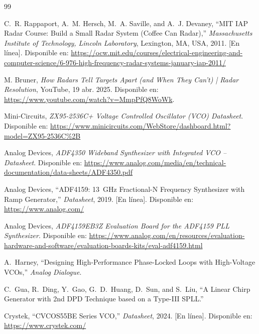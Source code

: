 
\renewcommand{\bibname}{Referencias}
\begin{thebibliography}{99}
\setcounter{enumiv}{9}   %
\setlength{\itemsep}{0.25em}
\setlength{\parskip}{0pt}
\setlength{\parsep}{0pt}


C.~R. Rappaport, A.~M. Hersch, M.~A. Saville, and A.~J. Devaney,
``MIT IAP Radar Course: Build a Small Radar System (Coffee Can Radar),''
\emph{Massachusetts Institute of Technology, Lincoln Laboratory},
Lexington, MA, USA, 2011. [En línea]. Disponible en:
\url{https://ocw.mit.edu/courses/electrical-engineering-and-computer-science/6-976-high-frequency-radar-systems-january-iap-2011/}

M. Bruner,
\emph{How Radars Tell Targets Apart (and When They Can’t) | Radar Resolution},
YouTube, 19 abr. 2025.
Disponible en:
\url{https://www.youtube.com/watch?v=MmpPfQ8WoWk}.

Mini-Circuits,
\emph{ZX95-2536C+ Voltage Controlled Oscillator (VCO) Datasheet}.
Disponible en:
\url{https://www.minicircuits.com/WebStore/dashboard.html?model=ZX95-2536C%2B}

Analog Devices,
\emph{ADF4350 Wideband Synthesizer with Integrated VCO -- Datasheet}.
Disponible en:
\url{https://www.analog.com/media/en/technical-documentation/data-sheets/ADF4350.pdf}

Analog Devices,
``ADF4159: 13~GHz Fractional-N Frequency Synthesizer with Ramp Generator,''
\emph{Datasheet}, 2019. [En línea].
Disponible en:
\url{https://www.analog.com/}

Analog Devices,
\emph{ADF4159EB3Z Evaluation Board for the ADF4159 PLL Synthesizer}.
Disponible en:
\url{https://www.analog.com/en/resources/evaluation-hardware-and-software/evaluation-boards-kits/eval-adf4159.html}

A.~Harney,
``Designing High-Performance Phase-Locked Loops with High-Voltage VCOs,''
\emph{Analog Dialogue}.

C.~Gua, R.~Ding, Y.~Gao, G.~D.~Huang, D.~Sun, and S.~Liu,
``A Linear Chirp Generator with 2nd DPD Technique based on a Type-III SPLL.''

Crystek,
``CVCOS55BE Series VCO,''
\emph{Datasheet}, 2024. [En línea].
Disponible en:
\url{https://www.crystek.com/}


\end{thebibliography}
